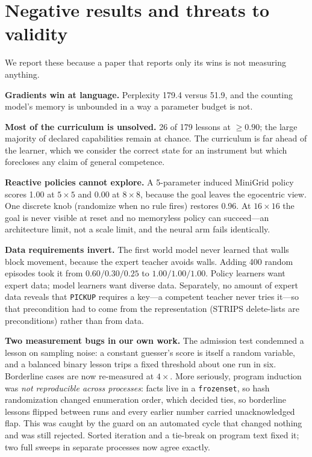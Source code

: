 \documentclass[11pt]{article}
\newcommand{\code}[1]{\texttt{\small #1}}
\begin{document}
\section{Negative results and threats to validity}
\label{sec:negative}

We report these because a paper that reports only its wins is not measuring
anything.

\textbf{Gradients win at language.} Perplexity 179.4 versus 51.9, and the
counting model's memory is unbounded in a way a parameter budget is not.

\textbf{Most of the curriculum is unsolved.} 26 of 179 lessons at $\ge0.90$; the
large majority of declared capabilities remain at chance. The curriculum is far ahead of the learner, which we
consider the correct state for an instrument but which forecloses any claim of
general competence.

\textbf{Reactive policies cannot explore.} A 5-parameter induced MiniGrid policy
scores 1.00 at $5\times5$ and 0.00 at $8\times8$, because the goal leaves the
egocentric view. One discrete knob (randomize when no rule fires) restores 0.96.
At $16\times16$ the goal is never visible at reset and no memoryless policy can
succeed---an architecture limit, not a scale limit, and the neural arm fails
identically.

\textbf{Data requirements invert.} The first world model never learned that walls
block movement, because the expert teacher avoids walls. Adding 400 random
episodes took it from $0.60/0.30/0.25$ to $1.00/1.00/1.00$. Policy learners want
expert data; model learners want diverse data. Separately, no amount of expert
data reveals that \code{PICKUP} requires a key---a competent teacher never tries
it---so that precondition had to come from the representation (STRIPS delete-lists
are preconditions) rather than from data.

\textbf{Two measurement bugs in our own work.} The admission test condemned a
lesson on sampling noise: a constant guesser's score is itself a random variable,
and a balanced binary lesson trips a fixed threshold about one run in six.
Borderline cases are now re-measured at $4\times$. More seriously, program
induction was \emph{not reproducible across processes}: facts live in a
\code{frozenset}, so hash randomization changed enumeration order, which decided
ties, so borderline lessons flipped between runs and every earlier number carried
unacknowledged flap. This was caught by the guard on an automated cycle that
changed nothing and was still rejected. Sorted iteration and a tie-break on
program text fixed it; two full sweeps in separate processes now agree exactly.
\end{document}
